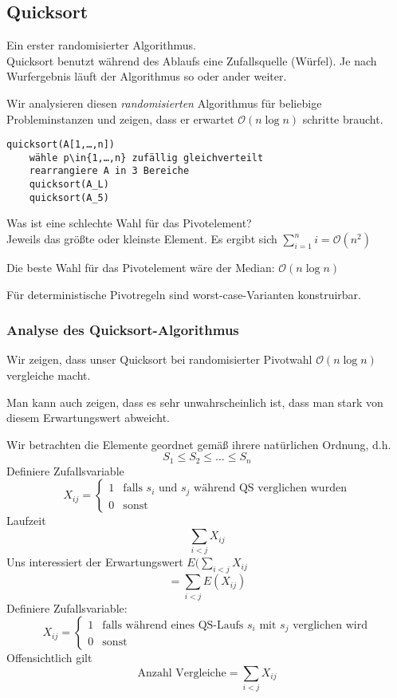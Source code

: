 \documentclass[11pt]{scrartcl}
\begin{document}
\subsection{Quicksort}
Ein erster randomisierter Algorithmus.\\
Quicksort benutzt während des Ablaufs eine Zufallsquelle (Würfel).
Je nach Wurfergebnis läuft der Algorithmus so oder ander weiter.

Wir analysieren diesen \emph{randomisierten} Algorithmus für beliebige Probleminstanzen und zeigen, dass er erwartet $\mathcal O(n\log n)$ schritte braucht.
\begin{verbatim}
quicksort(A[1,…,n])
	wähle p\in{1,…,n} zufällig gleichverteilt
	rearrangiere A in 3 Bereiche
	quicksort(A_L)
	quicksort(A_5)
\end{verbatim}
Was ist eine schlechte Wahl für das Pivotelement?\\
Jeweils das größte oder kleinste Element. Es ergibt sich $\sum_{i=1}^ni=\mathcal O(n^2)$

Die beste Wahl für das Pivotelement wäre der Median: $\mathcal O(n\log n)$

\begin{note}
Für deterministische Pivotregeln sind worst-case-Varianten konstruirbar.
\end{note}

\subsubsection{Analyse des Quicksort-Algorithmus}

Wir zeigen, dass unser Quicksort bei randomisierter Pivotwahl $\mathcal O(n\log n)$ vergleiche macht.
\begin{note}
Man kann auch zeigen, dass es sehr unwahrscheinlich ist, dass man stark von diesem Erwartungswert abweicht.
\end{note}
Wir betrachten die Elemente geordnet gemäß ihrere natürlichen Ordnung, d.h.
\[
S_1\le S_2\le …\le S_n
\]
Definiere Zufallsvariable
\[
X_{ij}=\begin{cases}1 &\text{falls $s_i$ und $s_j$ während QS verglichen wurden}\\
0&\text{sonst}\end{cases}
\]
Laufzeit
\[
\sum_{i<j}X_{ij}
\]
Uns interessiert der Erwartungswert $E(\sum_{i<j}X_{ij}$
\[
=\sum_{i<j}E(X_{ij})
\]
Definiere Zufallsvariable:
\[
X_{ij} = \begin{cases}
1 & \text{falls während eines QS-Laufs $s_i$ mit $s_j$ verglichen wird}\\
0 & \text{sonst}
\end{cases}
\]
Offensichtlich gilt
\[
\text{Anzahl Vergleiche} = \sum_{i<j}X_{ij}
\]
\end{document}
